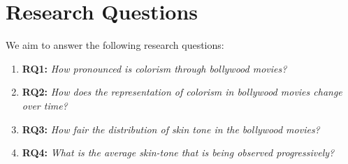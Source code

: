 \section{Research Questions}
\label{sec:questions}

We aim to answer the following research questions:

\begin{enumerate}
    \item \textbf{RQ1:} \textit{How pronounced is colorism through bollywood movies?}
    \item \textbf{RQ2:} \textit{How does the representation of colorism in bollywood movies change over time?}
    \item \textbf{RQ3:} \textit{How fair the distribution of skin tone in the bollywood movies?}
    \item \textbf{RQ4:} \textit{What is the average skin-tone that is being observed progressively?}
\end{enumerate}